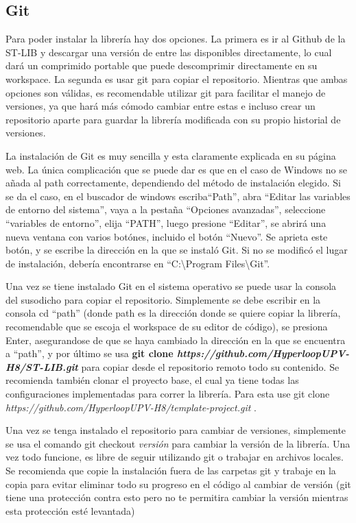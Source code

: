 \documentclass{report}
\begin{document}
\subsection{Git}
Para poder instalar la librería hay dos opciones. La primera es ir al Github de la ST-LIB y descargar una versión de entre las disponibles directamente, lo cual dará un comprimido portable que puede descomprimir directamente en su workspace. La segunda es usar git para copiar el repositorio. Mientras que ambas opciones son válidas, es recomendable utilizar git para facilitar el manejo de versiones, ya que hará más cómodo cambiar entre estas e incluso crear un repositorio aparte para guardar la librería modificada con su propio historial de versiones.
\par
La instalación de Git es muy sencilla\cite{web:git:installationGit} y esta claramente explicada en su página web\cite{web:git:installationGitHelp}. La única complicación que se puede dar es que en el caso de Windows no se añada al path correctamente, dependiendo del método de instalación elegido. Si se da el caso, en el buscador de windows escriba``Path'', abra ``Editar las variables de entorno del sistema'', vaya a la pestaña ``Opciones avanzadas'', seleccione ``variables de entorno'', elija ``PATH'', luego presione ``Editar'', se abrirá una nueva ventana con varios botónes, incluido el botón ``Nuevo''. Se aprieta este botón, y se escribe la dirección en la que se instaló Git. Si no se modificó el lugar de instalación, debería encontrarse en ``C{:}{\textbackslash}Program Files{\textbackslash}Git''. 
\par \vspace{0.3 cm}
Una vez se tiene instalado Git en el sistema operativo se puede usar la consola del susodicho para copiar el repositorio. Simplemente se debe escribir en la consola cd ``path'' (donde path es la dirección donde se quiere copiar la librería, recomendable que se escoja el workspace de su editor de código), se presiona Enter, asegurandose de que se haya cambiado la dirección en la que se encuentra a ``path'', y por último se usa \textbf{git clone \textit{https://github.com/HyperloopUPV-H8/ST-LIB.git}} \cite{web:github:STLIB} para copiar desde el repositorio remoto todo su contenido. Se recomienda también clonar el proyecto base, el cual ya tiene todas las configuraciones implementadas para correr la librería. Para esta use git clone \textit{https://github.com/HyperloopUPV-H8/template-project.git} \cite{web:github:templateproject}. \par \vspace{0.3 cm}
Una vez se tenga instalado el repositorio para cambiar de versiones, simplemente se usa el comando git checkout \textit{versión} para cambiar la versión de la librería. Una vez todo funcione, es libre de seguir utilizando git o trabajar en archivos locales. Se recomienda que copie la instalación fuera de las carpetas git y trabaje en la copia para evitar eliminar todo su progreso en el código al cambiar de versión (git tiene una protección contra esto pero no te permitira cambiar la versión mientras esta protección esté levantada)\par
\end{document}
